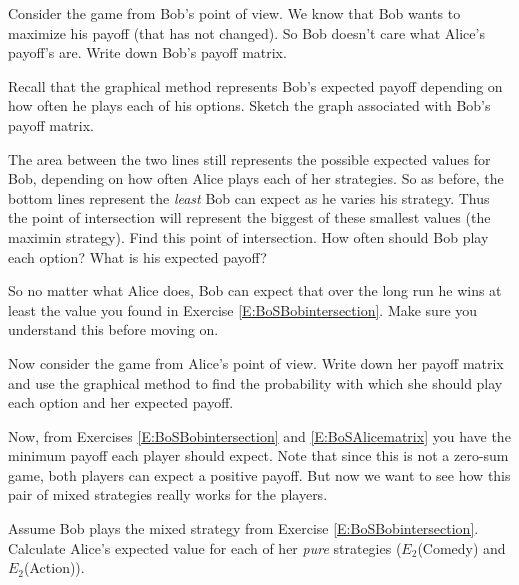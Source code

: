 \begin{xca}\label{E:BoSBobsmatrix}
Consider the game from Bob's point of view. We know that Bob wants to maximize his payoff (that has not changed). So Bob doesn't care what Alice's payoff's are. Write down Bob's payoff matrix.
\end{xca}

\begin{xca}\label{E:BoSBobgraph}
Recall that the graphical method represents Bob's expected payoff depending on how often he plays each of his options. Sketch the graph associated with Bob's payoff matrix. 
\end{xca}

\begin{xca}\label{E:BoSBobintersection}
The area between the two lines still represents the possible expected values for Bob, depending on how often Alice plays each of her strategies. So as before, the bottom lines represent the \emph{least} Bob can expect as he varies his strategy. Thus the point of intersection will represent the biggest of these smallest values (the maximin strategy). Find this point of intersection. How often should Bob play each option? What is his expected payoff?
\end{xca}


So no matter what Alice does, Bob can expect that over the long run he wins at least the value you found in Exercise \ref{E:BoSBobintersection}. Make sure you understand this before moving on.


\begin{xca}\label{E:BoSAlicematrix}
Now consider the game from Alice's point of view. Write down her payoff matrix and use the graphical method to find the probability with which she should play each option and her expected payoff.
\end{xca}

Now, from Exercises \ref{E:BoSBobintersection} and \ref{E:BoSAlicematrix} you have the minimum payoff each player should expect. Note that since this is not a zero-sum game, both players can expect a positive payoff. But now we want to see how this pair of mixed strategies really works for the players.


\begin{xca}\label{E:BoSBobsmaximin}
Assume Bob plays the mixed strategy from Exercise \ref{E:BoSBobintersection}. Calculate Alice's expected value for each of her \emph{pure} strategies ($E_2$(Comedy) and $E_2$(Action)).
\end{xca}

